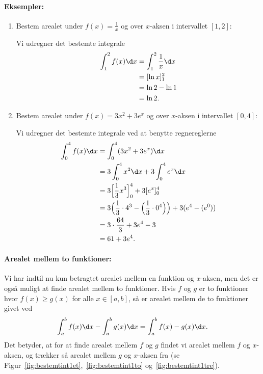 \paragraph*{Eksempler:}
\begin{enumerate}
\item Bestem arealet under $f(x)=\frac{1}{x}$ og over $x$-aksen i intervallet $[1,2]$:

Vi udregner det bestemte integrale
\begin{align*}
\int_1^2 f(x) \d x &= \int_1^2 \frac{1}{x} \d x \\
&=[\ln x]_1^2 \\
&=\ln 2 - \ln 1 \\
&=\ln 2.
\end{align*}

\item Bestem arealet under $f(x)=3x^2+3e^x$ og over $x$-aksen i intervallet $[0,4]$:

Vi udregner det bestemte integrale ved at benytte regnereglerne
\begin{align*}
\int_0^4 f(x) \d x &= \int_0^4 (3x^2+3e^x) \d x \\
&= 3\int_0^4 x^2 \d x+ 3 \int_0^4 e^x \d x \\
&= 3\Big[ \frac{1}{3}x^3 \Big]_0^4 + 3[e^x]_0^4 \\
&=3 \Big(\frac{1}{3}\cdot 4^3 - \Big(\frac{1}{3} \cdot 0^4 \Big) \Big) + 3 ( e^4 - (e^0)) \\
&=3 \cdot \frac{64}{3} + 3e^4-3\\
&=61+3e^4.
\end{align*}
\end{enumerate}

\paragraph*{Arealet mellem to funktioner:}
Vi har indtil nu kun betragtet arealet mellem en funktion og $x$-aksen, men det er også muligt at finde arealet mellem to funktioner. Hvis $f$ og $g$ er to funktioner hvor $f(x) \geq g(x)$ for alle $x \in [a,b]$, så er arealet mellem de to funktioner givet ved
\begin{align*}
\int_a^b f(x) \d x - \int_a^b g(x) \d x = \int_a^b f(x) - g(x) \d x.
\end{align*}
Det betyder, at for at finde arealet mellem $f$ og $g$ findet vi arealet mellem $f$ og $x$-aksen, og trækker så arealet mellem $g$ og $x$-aksen fra (se Figur~\ref{fig:bestemtint1et},~\ref{fig:bestemtint1to} og~\ref{fig:bestemtint1tre}).


